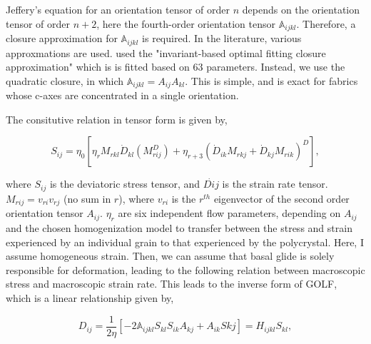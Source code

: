 \documentclass{report}
\begin{document}
Jeffery's equation for an orientation tensor of order $n$ depends on the orientation tensor of order $n+2$, here the fourth-order orientation tensor $\mathbb{A}_{ijkl}$. Therefore, a closure approximation for $\mathbb{A}_{ijkl}$ is required. In the literature, various approxmations are used. \citet{gillet-chaulet2006} used the "invariant-based optimal fitting closure approximation" which is is fitted based on 63 parameters. Instead, we use the quadratic closure, in which $\mathbb{A}_{ijkl} = A_{ij} A_{kl}$. This is simple, and is exact for fabrics whose c-axes are concentrated in a single orientation. 



The consitutive relation in tensor form is given by,

\begin{equation}
S_{ij} = \eta_0 \left[ \eta_r M_{rkl} \dot{D}_{kl} \left( M_{rij}^D \right)  + \eta_{r+3} \left( \dot{D}_{ik} M_{rkj} + \dot{D}_{kj} M_{rik} \right)^D \right],
\end{equation}

where $S_{ij}$ is the deviatoric stress tensor, and $\dot{D{ij}}$ is the strain rate tensor. $M_{rij} = v_{ri} v_{rj}$ (no sum in $r$), where $v_{ri}$ is the $r^{th}$ eigenvector of the second order orientation tensor $A_{ij}$. $\eta_r$ are six independent flow parameters, depending on $A_{ij}$ and the chosen homogenization model to transfer between the stress and strain experienced by an individual grain to that experienced by the polycrystal. Here, I assume homogeneous strain. Then, we can assume that basal glide is solely responsible for deformation, leading to the following relation between macroscopic stress and macroscopic strain rate. This leads to the inverse form of GOLF, which is a linear relationship given by,

\begin{equation}
   D_{ij} = \frac{1}{2 \eta} \left[ -2 \mathbb{A}_{ijkl}S_{kl}  S_{ik}A_{kj} + A_{ik}S{kj} \right] = H_{ijkl} S_{kl},
\end{equation}
\end{document}

